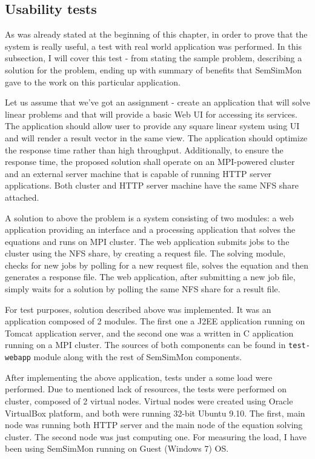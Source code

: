 \subsection{Usability tests}

As was already stated at the beginning of this chapter, in order to prove that the system is really useful, a test with real world application was performed. In this subsection, I will cover this test - from stating the sample problem, describing a solution for the problem, ending up with summary of benefits that SemSimMon gave to the work on this particular application.

Let us assume that we\rq{}ve got an assignment - create an application that will solve linear problems and that will provide a basic Web UI for accessing its services. The application should allow user to provide any square linear system using UI and will render a result vector in the same view. The application should optimize the response time rather than high throughput. Additionally, to ensure the response time, the proposed solution shall operate on an MPI-powered cluster and an external server machine that is capable of running HTTP server applications. Both cluster and HTTP server machine have the same NFS share attached. 

A solution to above the problem is a system consisting of two modules: a web application providing an interface and a processing application that solves the equations and runs on MPI cluster. The web application submits jobs to the cluster using the NFS share, by creating a request file. The solving module, checks for new jobs by polling for a new request file, solves the equation and then generates a response file. The web application, after submitting a new job file, simply waits for a solution by polling the same NFS share for a result file. 

For test purposes, solution described above was implemented. It was an application composed of 2 modules. The first one a J2EE application running on Tomcat application server, and the second one was a written in C application running on a MPI cluster. The sources of both components can be found in \texttt{test-webapp} module along with the rest of SemSimMon components.

After implementing the above application, tests under a some load were performed. Due to mentioned lack of resources, the tests were performed on cluster, composed of 2 virtual nodes. Virtual nodes were created using Oracle VirtualBox platform, and both were running 32-bit Ubuntu 9.10. The first, main node was running both HTTP server and the main node of the equation solving cluster. The second node was just computing one. For measuring the load, I have been using SemSimMon running on Guest (Windows 7) OS. 

